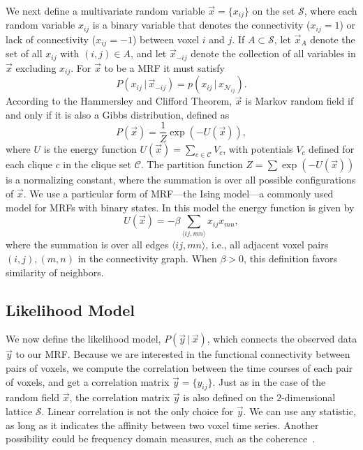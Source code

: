 \documentclass[runningheads,a4paper]{llncs}
\begin{document}
We next define a multivariate random variable $\vec x = \{ x_{ij} \}$ on the set
$\mathcal{S}$, where each random variable $x_{ij}$ is a binary variable that
denotes the connectivity ($x_{ij} = 1$) or lack of connectivity ($x_{ij} = -1$)
between voxel $i$ and $j$. If $A \subset \mathcal{S}$, let $\vec x_A$ denote the
set of all $x_{ij}$ with $(i,j) \in A$, and let $\vec x_{-ij}$ denote the
collection of all variables in $\vec x$ excluding $x_{ij}$. For $\vec x$ to be a
MRF it must satisfy
\begin{equation*}
  P( x_{ij} \, | \, \vec x_{-ij}) = p(x_{ij} \, | \, x_{\mathcal{N}_{ij}}).
\end{equation*}
According to the Hammersley and Clifford
Theorem\cite{besag_spatial_1974}, $\vec x$ is Markov random field if
and only if it is also a Gibbs distribution, defined as
\begin{equation}
  P(\vec x) = \frac{1}{Z}\exp\left(-U(\vec x)\right), 
\end{equation}
where $U$ is the energy function $U(\vec x) = \sum_{c \in \mathcal{C}}
V_c$, with potentials $V_c$ defined for each clique $c$ in the clique
set $\mathcal{C}$. The partition function $Z = \sum \exp(-U(\vec x))$
is a normalizing constant, where the summation is over all possible
configurations of $\vec x$. We use a particular form of MRF---the
Ising model---a commonly used model for MRFs with binary states. In
this model the energy function is given by
\begin{equation}
U(\vec x) = - \beta \sum_{\langle ij, mn \rangle} x_{ij} x_{mn},
 \label{eq:A1}
\end{equation}
where the summation is over all edges $\langle ij, mn \rangle$, i.e., all
adjacent voxel pairs $(i,j), (m,n)$ in the connectivity graph. When $\beta > 0$,
this definition favors similarity of neighbors.
\subsection{Likelihood Model}
We now define the likelihood model, $P(\vec y \, | \, \vec x)$, which connects
the observed data $\vec y$ to our MRF. Because we are interested in the
functional connectivity between pairs of voxels, we compute the correlation
between the time courses of each pair of voxels, and get a correlation matrix
$\vec y = \{y_{ij}\}$. Just as in the case of the random field $\vec x$, the
correlation matrix $\vec y$ is also defined on the $2$-dimensional lattice
$\mathcal{S}$. Linear correlation is not the only choice for $\vec y$. We can
use any statistic, as long as it indicates the affinity between two voxel time
series. Another possibility could be frequency domain measures, such as the
coherence~\cite{mller_multivariate_2001}.
\end{document}

